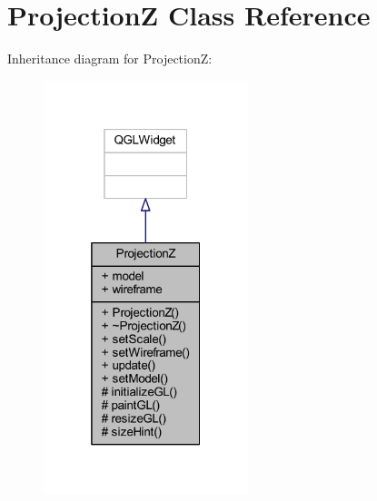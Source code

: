 \hypertarget{class_projection_z}{}\section{ProjectionZ Class Reference}
\label{class_projection_z}


Inheritance diagram for ProjectionZ\+:
\nopagebreak
\begin{figure}[H]
\begin{center}
\leavevmode
\includegraphics[width=169pt]{class_projection_z__inherit__graph}
\end{center}
\end{figure}


